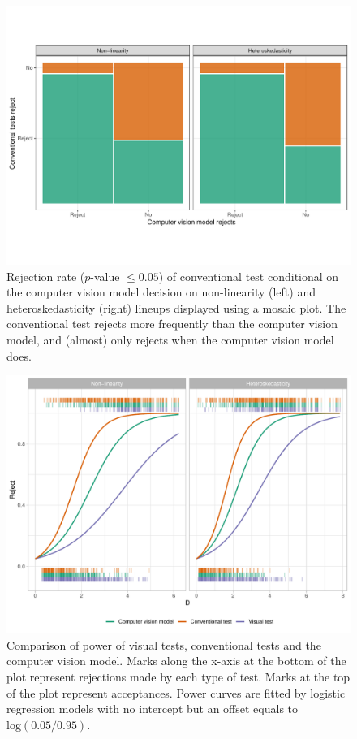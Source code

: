 \documentclass[]{interact}
\theoremstyle{plain}%
\theoremstyle{definition}
\theoremstyle{remark}
\begin{document}
\begin{figure}[!h]

{\centering \includegraphics[width=1\linewidth]{paper_files/figure-latex/conv-mosaic-1} 

}

\caption{Rejection rate ($p$-value $\leq0.05$) of conventional test conditional on the computer vision model decision on non-linearity (left) and heteroskedasticity (right) lineups displayed using a mosaic plot. The conventional test rejects more frequently than the computer vision model, and (almost) only rejects when the computer vision model does.}\label{fig:conv-mosaic}
\end{figure}

\begin{figure}[!h]

{\centering \includegraphics[width=1\linewidth]{paper_files/figure-latex/power-1} 

}

\caption{Comparison of power of visual tests, conventional tests and the computer vision model. Marks along the x-axis at the bottom of the plot represent rejections made by each type of test. Marks at the top of the plot represent acceptances. Power curves are fitted by logistic regression models with no intercept but an offset equals to $\text{log}(0.05/0.95)$.}\label{fig:power}
\end{figure}
\end{document}
